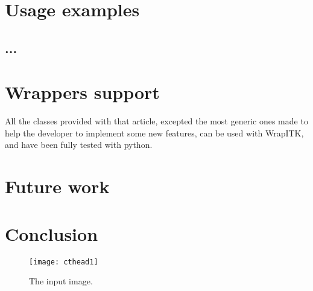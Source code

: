 \documentclass{InsightArticle}
\begin{document}
\section{Usage examples}

\subsection{...}


\section{Wrappers support}

All the classes provided with that article, excepted the most generic ones made
to help the developer to implement some new features, can be used with WrapITK,
and have been fully tested with python.

\section{Future work}

\section{Conclusion}







\begin{figure}[htbp]
\centering
\texttt{[image: cthead1]}
\caption{The input image.\label{cthead1}}
\end{figure}


\appendix





\nocite{ITKSoftwareGuide}
\end{document}
